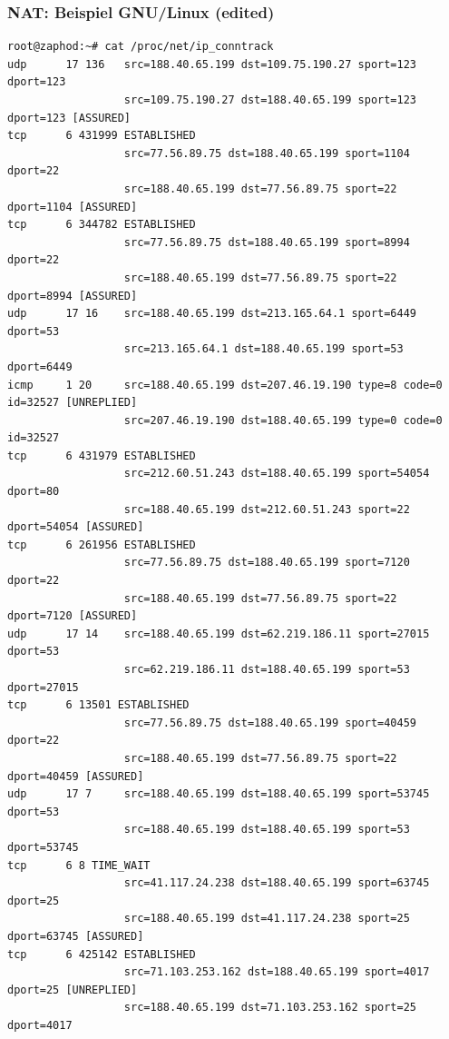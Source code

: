 \documentclass[ignorenonframetext]{beamer}
\begin{document}
\begin{frame}[fragile]
\frametitle{NAT: Beispiel GNU/Linux (edited)}
	\begin{tiny}
		\begin{verbatim}
root@zaphod:~# cat /proc/net/ip_conntrack
udp      17 136   src=188.40.65.199 dst=109.75.190.27 sport=123 dport=123
                  src=109.75.190.27 dst=188.40.65.199 sport=123 dport=123 [ASSURED]
tcp      6 431999 ESTABLISHED
                  src=77.56.89.75 dst=188.40.65.199 sport=1104 dport=22 
                  src=188.40.65.199 dst=77.56.89.75 sport=22 dport=1104 [ASSURED]
tcp      6 344782 ESTABLISHED
                  src=77.56.89.75 dst=188.40.65.199 sport=8994 dport=22 
                  src=188.40.65.199 dst=77.56.89.75 sport=22 dport=8994 [ASSURED]
udp      17 16    src=188.40.65.199 dst=213.165.64.1 sport=6449 dport=53
                  src=213.165.64.1 dst=188.40.65.199 sport=53 dport=6449
icmp     1 20     src=188.40.65.199 dst=207.46.19.190 type=8 code=0 id=32527 [UNREPLIED] 
                  src=207.46.19.190 dst=188.40.65.199 type=0 code=0 id=32527
tcp      6 431979 ESTABLISHED
                  src=212.60.51.243 dst=188.40.65.199 sport=54054 dport=80 
                  src=188.40.65.199 dst=212.60.51.243 sport=22 dport=54054 [ASSURED]
tcp      6 261956 ESTABLISHED
                  src=77.56.89.75 dst=188.40.65.199 sport=7120 dport=22
                  src=188.40.65.199 dst=77.56.89.75 sport=22 dport=7120 [ASSURED]
udp      17 14    src=188.40.65.199 dst=62.219.186.11 sport=27015 dport=53 
                  src=62.219.186.11 dst=188.40.65.199 sport=53 dport=27015
tcp      6 13501 ESTABLISHED
                  src=77.56.89.75 dst=188.40.65.199 sport=40459 dport=22
                  src=188.40.65.199 dst=77.56.89.75 sport=22 dport=40459 [ASSURED]
udp      17 7     src=188.40.65.199 dst=188.40.65.199 sport=53745 dport=53 
                  src=188.40.65.199 dst=188.40.65.199 sport=53 dport=53745
tcp      6 8 TIME_WAIT
                  src=41.117.24.238 dst=188.40.65.199 sport=63745 dport=25 
                  src=188.40.65.199 dst=41.117.24.238 sport=25 dport=63745 [ASSURED]
tcp      6 425142 ESTABLISHED
                  src=71.103.253.162 dst=188.40.65.199 sport=4017 dport=25 [UNREPLIED]                   
                  src=188.40.65.199 dst=71.103.253.162 sport=25 dport=4017
		\end{verbatim}
	\end{tiny}
\end{frame}
\end{document}
